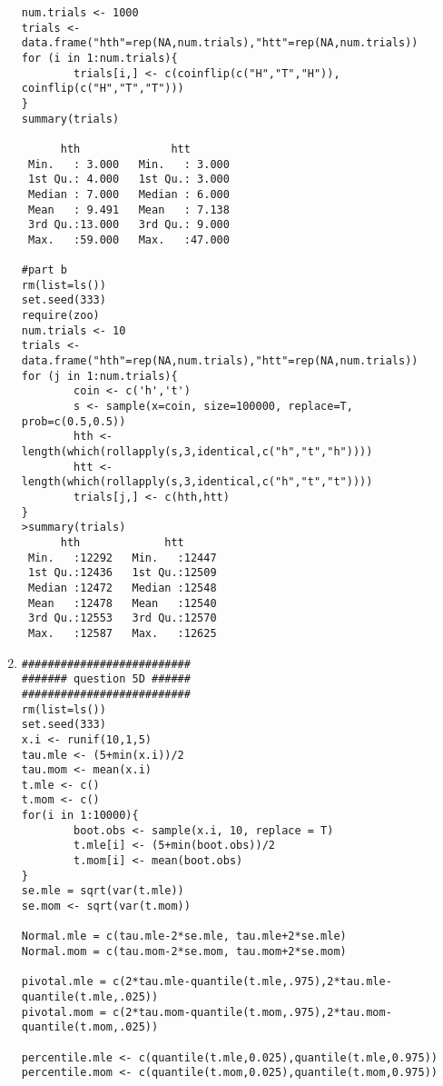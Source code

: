 \documentclass[letterpaper]{article}
\begin{document}
\begin{enumerate}
\begin{verbatim}
num.trials <- 1000
trials <- data.frame("hth"=rep(NA,num.trials),"htt"=rep(NA,num.trials))
for (i in 1:num.trials){
        trials[i,] <- c(coinflip(c("H","T","H")), coinflip(c("H","T","T")))
}
summary(trials)

      hth              htt        
 Min.   : 3.000   Min.   : 3.000  
 1st Qu.: 4.000   1st Qu.: 3.000  
 Median : 7.000   Median : 6.000  
 Mean   : 9.491   Mean   : 7.138  
 3rd Qu.:13.000   3rd Qu.: 9.000  
 Max.   :59.000   Max.   :47.000

#part b
rm(list=ls())
set.seed(333)
require(zoo)
num.trials <- 10
trials <- data.frame("hth"=rep(NA,num.trials),"htt"=rep(NA,num.trials))
for (j in 1:num.trials){
        coin <- c('h','t')
        s <- sample(x=coin, size=100000, replace=T, prob=c(0.5,0.5))       
        hth <- length(which(rollapply(s,3,identical,c("h","t","h"))))
        htt <- length(which(rollapply(s,3,identical,c("h","t","t"))))
        trials[j,] <- c(hth,htt)
}
>summary(trials)
      hth             htt       
 Min.   :12292   Min.   :12447  
 1st Qu.:12436   1st Qu.:12509  
 Median :12472   Median :12548  
 Mean   :12478   Mean   :12540  
 3rd Qu.:12553   3rd Qu.:12570  
 Max.   :12587   Max.   :12625
\end{verbatim}

\item 
\begin{verbatim}
##########################
####### question 5D ######
##########################
rm(list=ls())
set.seed(333)
x.i <- runif(10,1,5)
tau.mle <- (5+min(x.i))/2
tau.mom <- mean(x.i)
t.mle <- c()
t.mom <- c()
for(i in 1:10000){
        boot.obs <- sample(x.i, 10, replace = T)
        t.mle[i] <- (5+min(boot.obs))/2
        t.mom[i] <- mean(boot.obs)
}
se.mle = sqrt(var(t.mle))
se.mom <- sqrt(var(t.mom))

Normal.mle = c(tau.mle-2*se.mle, tau.mle+2*se.mle)
Normal.mom = c(tau.mom-2*se.mom, tau.mom+2*se.mom)

pivotal.mle = c(2*tau.mle-quantile(t.mle,.975),2*tau.mle-quantile(t.mle,.025))
pivotal.mom = c(2*tau.mom-quantile(t.mom,.975),2*tau.mom-quantile(t.mom,.025))

percentile.mle <- c(quantile(t.mle,0.025),quantile(t.mle,0.975))
percentile.mom <- c(quantile(t.mom,0.025),quantile(t.mom,0.975))
\end{verbatim}

\end{enumerate}
\end{document}
